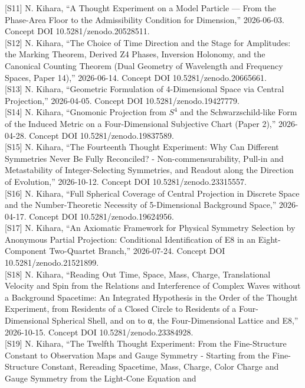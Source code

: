 \documentclass[
  a4paper,
]{article}
\begin{document}
{[}S11{]} N. Kihara, ``A Thought Experiment on a Model Particle --- From
the Phase-Area Floor to the Admissibility Condition for Dimension,''
2026-06-03. Concept DOI 10.5281/zenodo.20528511.\\
{[}S12{]} N. Kihara, ``The Choice of Time Direction and the Stage for
Amplitudes: the Marking Theorem, Derived Z4 Phases, Inversion Holonomy,
and the Canonical Counting Theorem (Dual Geometry of Wavelength and
Frequency Spaces, Paper 14),'' 2026-06-14. Concept DOI
10.5281/zenodo.20665661.\\
{[}S13{]} N. Kihara, ``Geometric Formulation of 4-Dimensional Space via
Central Projection,'' 2026-04-05. Concept DOI 10.5281/zenodo.19427779.\\
{[}S14{]} N. Kihara, ``Gnomonic Projection from \(S^4\) and the
Schwarzschild-like Form of the Induced Metric on a Four-Dimensional
Subjective Chart (Paper 2),'' 2026-04-28. Concept DOI
10.5281/zenodo.19837589.\\
{[}S15{]} N. Kihara, ``The Fourteenth Thought Experiment: Why Can
Different Symmetries Never Be Fully Reconciled? - Non-commensurability,
Pull-in and Metastability of Integer-Selecting Symmetries, and Readout
along the Direction of Evolution,'' 2026-10-12. Concept DOI
10.5281/zenodo.23315557.\\
{[}S16{]} N. Kihara, ``Full Spherical Coverage of Central Projection in
Discrete Space and the Number-Theoretic Necessity of 5-Dimensional
Background Space,'' 2026-04-17. Concept DOI 10.5281/zenodo.19624956.\\
{[}S17{]} N. Kihara, ``An Axiomatic Framework for Physical Symmetry
Selection by Anonymous Partial Projection: Conditional Identification of
E8 in an Eight-Component Two-Quartet Branch,'' 2026-07-24. Concept DOI
10.5281/zenodo.21521899.\\
{[}S18{]} N. Kihara, ``Reading Out Time, Space, Mass, Charge,
Translational Velocity and Spin from the Relations and Interference of
Complex Waves without a Background Spacetime: An Integrated Hypothesis
in the Order of the Thought Experiment, from Residents of a Closed
Circle to Residents of a Four-Dimensional Spherical Shell, and on to α,
the Four-Dimensional Lattice and E8,'' 2026-10-15. Concept DOI
10.5281/zenodo.23384928.\\
{[}S19{]} N. Kihara, ``The Twelfth Thought Experiment: From the
Fine-Structure Constant to Observation Maps and Gauge Symmetry -
Starting from the Fine-Structure Constant, Rereading Spacetime, Mass,
Charge, Color Charge and Gauge Symmetry from the Light-Cone Equation and
\end{document}
